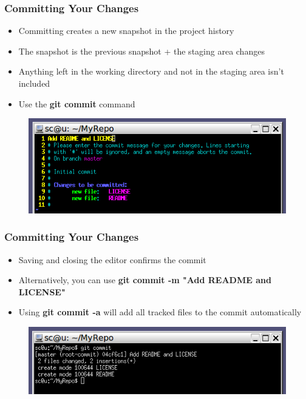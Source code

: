 \documentclass{beamer}
\begin{document}
\begin{frame}
	\frametitle{Committing Your Changes}
	\begin{itemize}
		\item{Committing creates a new snapshot in the project history}
		\item{The snapshot is the previous snapshot + the staging area changes}
		\item{Anything left in the working directory and not in the staging area isn't included}
		\item{Use the \textbf{git commit} command}
	\end{itemize}
	\begin{figure}
		\includegraphics[scale=0.62]{Committing_Your_Changes-0.png}
	\end{figure}
\end{frame}

\begin{frame}
	\frametitle{Committing Your Changes}
	\begin{itemize}
		\item{Saving and closing the editor confirms the commit}
		\item{Alternatively, you can use \textbf{git commit -m "Add README and LICENSE"}}
		\item{Using \textbf{git commit -a} will add all tracked files to the commit automatically}
	\end{itemize}
	\begin{figure}
		\includegraphics[scale=0.62]{Committing_Your_Changes-1.png}
	\end{figure}
\end{frame}
\end{document}
